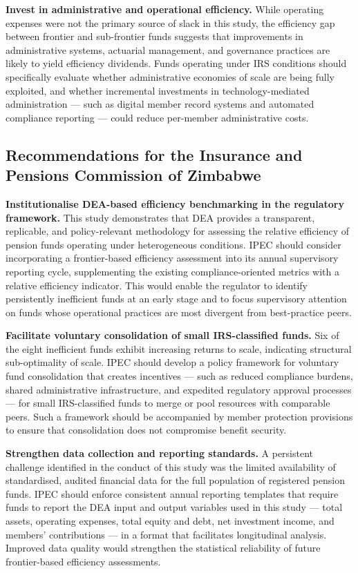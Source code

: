 \documentclass[12pt,a4paper]{article}
\begin{document}
\textbf{Invest in administrative and operational efficiency.} While operating expenses were not the primary source of slack in this study, the efficiency gap between frontier and sub-frontier funds suggests that improvements in administrative systems, actuarial management, and governance practices are likely to yield efficiency dividends. Funds operating under IRS conditions should specifically evaluate whether administrative economies of scale are being fully exploited, and whether incremental investments in technology-mediated administration --- such as digital member record systems and automated compliance reporting --- could reduce per-member administrative costs.

\subsection{Recommendations for the Insurance and Pensions Commission of Zimbabwe}

\textbf{Institutionalise DEA-based efficiency benchmarking in the regulatory framework.} This study demonstrates that DEA provides a transparent, replicable, and policy-relevant methodology for assessing the relative efficiency of pension funds operating under heterogeneous conditions. IPEC should consider incorporating a frontier-based efficiency assessment into its annual supervisory reporting cycle, supplementing the existing compliance-oriented metrics with a relative efficiency indicator. This would enable the regulator to identify persistently inefficient funds at an early stage and to focus supervisory attention on funds whose operational practices are most divergent from best-practice peers.

\textbf{Facilitate voluntary consolidation of small IRS-classified funds.} Six of the eight inefficient funds exhibit increasing returns to scale, indicating structural sub-optimality of scale. IPEC should develop a policy framework for voluntary fund consolidation that creates incentives --- such as reduced compliance burdens, shared administrative infrastructure, and expedited regulatory approval processes --- for small IRS-classified funds to merge or pool resources with comparable peers. Such a framework should be accompanied by member protection provisions to ensure that consolidation does not compromise benefit security.

\textbf{Strengthen data collection and reporting standards.} A persistent challenge identified in the conduct of this study was the limited availability of standardised, audited financial data for the full population of registered pension funds. IPEC should enforce consistent annual reporting templates that require funds to report the DEA input and output variables used in this study --- total assets, operating expenses, total equity and debt, net investment income, and members' contributions --- in a format that facilitates longitudinal analysis. Improved data quality would strengthen the statistical reliability of future frontier-based efficiency assessments.
\end{document}
